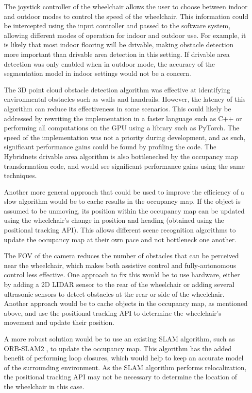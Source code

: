 The joystick controller of the wheelchair allows the user to choose between
indoor and outdoor modes to control the speed of the wheelchair. This information could be intercepted using
the input controller and passed to the software system, allowing different modes
of operation for indoor and outdoor use. For example, it is likely that
most indoor flooring will be drivable, making obstacle detection more important
than drivable area detection in this setting. If drivable area detection was
only enabled when in outdoor mode, the accuracy of the segmentation model
in indoor settings would not be a concern.

The 3D point cloud obstacle detection algorithm was effective
at identifying environmental obstacles such as walls and handrails.
However, the latency of this algorithm can reduce its effectiveness
in some scenarios. This could likely be addressed by rewriting the
implementation in a faster language such as C++ or performing all
computations on the GPU using a library such as PyTorch.
The speed of the implementation was not a priority during development,
and as such, significant performance gains could be found by
profiling the code. The Hybridnets drivable area
algorithm is also bottlenecked by the occupancy map transformation code,
and would see significant performance gains using the same techniques.

Another more general approach that could be used to improve the
efficiency of a slow algorithm would be to cache results in the occupancy map.
If the object is assumed to be unmoving, its position within the occupancy
map can be updated using the wheelchair's change in position and heading
(obtained using the positional tracking API). This allows different scene recognition
algorithms to update the occupancy map at their own pace and not bottleneck
one another.

The FOV of the camera reduces the number of obstacles that can be perceived near the wheelchair,
which makes both assistive control and fully-autonomous control less effective. One approach
to fix this would be to use hardware, either by adding a 2D LIDAR sensor to the rear of the
wheelchair or adding several ultrasonic sensors to detect obstacles at the rear or side
of the wheelchair. Another approach would be to cache objects in the occupancy map,
as mentioned above, and use the positional tracking API to determine the
wheelchair's movement and update their position.

A more robust solution would be
to use an existing SLAM algorithm, such as ORB-SLAM2 \cite{mur-artalORBSLAM2OpenSourceSLAM2017},
to update the occupancy map. This algorithm has the added benefit of performing
loop closures, which would help to keep an accurate model of the surrounding environment.
As the SLAM algorithm performs relocalization, the positional tracking API may not
be necessary to determine the location of the wheelchair in this case.


